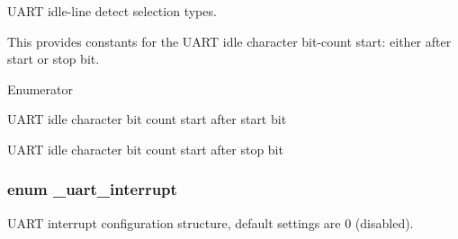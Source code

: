 U\+A\+RT idle-\/line detect selection types. 

This provides constants for the U\+A\+RT idle character bit-\/count start\+: either after start or stop bit. \begin{Desc}
\item[Enumerator]\par
\begin{description}
\item[{\em 
k\+Uart\+Idle\+Line\+After\+Start\+Bit\hypertarget{group__uart__hal_ggafcbb35202aa124845649edb0607d994daf6156450600a19995b4c47d0b4358d9d}{}\label{group__uart__hal_ggafcbb35202aa124845649edb0607d994daf6156450600a19995b4c47d0b4358d9d}
}]U\+A\+RT idle character bit count start after start bit \item[{\em 
k\+Uart\+Idle\+Line\+After\+Stop\+Bit\hypertarget{group__uart__hal_ggafcbb35202aa124845649edb0607d994da564a13c59cf3aa1cbf7322eb1c0930a9}{}\label{group__uart__hal_ggafcbb35202aa124845649edb0607d994da564a13c59cf3aa1cbf7322eb1c0930a9}
}]U\+A\+RT idle character bit count start after stop bit \end{description}
\end{Desc}
\subsubsection[{\texorpdfstring{\+\_\+uart\+\_\+interrupt}{_uart_interrupt}}]{\setlength{\rightskip}{0pt plus 5cm}enum {\bf \+\_\+uart\+\_\+interrupt}}\hypertarget{group__uart__hal_ga0241bd5ddb8629625e7facd8da941fd9}{}\label{group__uart__hal_ga0241bd5ddb8629625e7facd8da941fd9}


U\+A\+RT interrupt configuration structure, default settings are 0 (disabled). 


